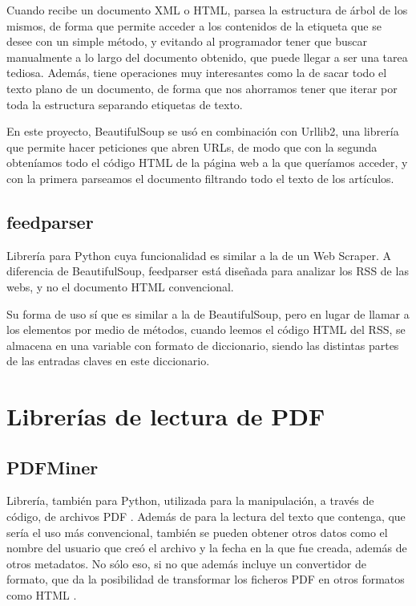 Cuando recibe un documento XML o HTML, parsea la estructura de árbol de los mismos, de forma que permite acceder a los contenidos de la etiqueta que se desee con un simple método, y evitando al programador tener que buscar manualmente a lo largo del documento obtenido, que puede llegar a ser una tarea tediosa. Además, tiene operaciones muy interesantes como la de sacar todo el texto plano de un documento, de forma que nos ahorramos tener que iterar por toda la estructura separando etiquetas de texto.

En este proyecto, BeautifulSoup se usó en combinación con Urllib2, una librería que permite hacer peticiones que abren URLs, de modo que con la segunda obteníamos todo el código HTML de la página web a la que queríamos acceder, y con la primera parseamos el documento filtrando todo el texto de los artículos.

\subsection{feedparser}

Librería para Python cuya funcionalidad es similar a la de un Web Scraper. A diferencia de BeautifulSoup, feedparser \cite{feedparser} está diseñada para analizar los RSS de las webs, y no el documento HTML convencional. 

Su forma de uso sí que es similar a la de BeautifulSoup, pero en lugar de llamar a los elementos por medio de métodos, cuando leemos el código HTML del RSS, se almacena en una variable con formato de diccionario, siendo las distintas partes de las entradas claves en este diccionario.

\section{Librerías de lectura de PDF}

\subsection{PDFMiner}

Librería, también para Python, utilizada para la manipulación, a través de código, de archivos PDF \cite{shinyama2015pdfminer} \cite{pdfminer}. Además de para la lectura del texto que contenga, que sería el uso más convencional, también se pueden obtener otros datos como el nombre del usuario que creó el archivo y la fecha en la que fue creada, además de otros metadatos.
No sólo eso, si no que además incluye un convertidor de formato, que da la posibilidad de transformar los ficheros PDF en otros formatos como HTML \cite{pdfminer}.

